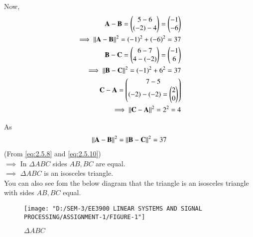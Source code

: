 \documentclass[journal,12pt,twocolumn]{IEEEtran}
\begin{document}
Now,\\
\begin{align}
	\mathbf{A-B} = \begin{pmatrix}5-6 \\ (-2)-4\end{pmatrix} = \begin{pmatrix}-1 \\ -6\end{pmatrix} \label{eq:2.5.7}\\
\implies \left\lVert\mathbf{A-B}\right\rVert^{2} = (-1)^{2}+(-6)^{2} = 37 \label{eq:2.5.8}\\
\mathbf{B-C} = \begin{pmatrix}6-7 \\ 4-(-2)\end{pmatrix} = \begin{pmatrix}-1 \\ 6\end{pmatrix} \label{eq:2.5.9}\\
\implies \left\lVert\mathbf{B-C}\right\rVert^{2} = (-1)^{2}+6^{2} = 37 \label{eq:2.5.10}\\
\mathbf{C-A} = \begin{pmatrix}7-5 \\ (-2)-(-2) = \begin{pmatrix}2 \\ 0\end{pmatrix}\end{pmatrix} \label{eq:2.5.11}\\
\implies \left\lVert\mathbf{C-A}\right\rVert^{2} = 2^{2} = 4 \label{eq:2.5.12}
\end{align}
 
 As 
\begin{align}
	 \left\lVert\mathbf{A-B}\right\rVert^{2} = \left\lVert\mathbf{B-C}\right\rVert^{2} = 37 \label{eq:2.5.13}
\end{align}
(From \eqref{eq:2.5.8} and \eqref{eq:2.5.10})\\
 $\implies$ In $\Delta ABC$ sides $AB, BC$ are equal.\\
 $\implies$ $\Delta ABC$ is an isosceles triangle.\\
 
 You can also see fom the below diagram that the triangle is an isosceles triangle with sides $AB, BC$ equal.
 
 \begin{figure}[h]
 	\centering
 	\texttt{[image: "D:/SEM-3/EE3900 LINEAR SYSTEMS AND SIGNAL PROCESSING/ASSIGNMENT-1/FIGURE-1"]}
 	\caption{$\Delta ABC$}
 	\label{fig:2.5}
 \end{figure}
\end{document}
